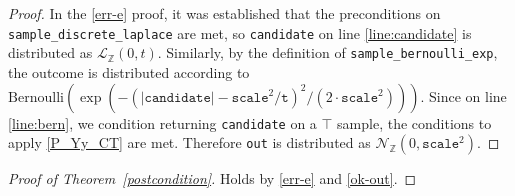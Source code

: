 \documentclass{article}
\begin{document}
\begin{proof} 
    In the \ref{err-e} proof, it was established that the preconditions on \texttt{sample\_discrete\_laplace} are met,  
    so \texttt{candidate} on line \ref{line:candidate} is distributed as $\mathcal{L}_\mathbb{Z}(0, t)$. 
    Similarly, by the definition of \texttt{sample\_bernoulli\_exp}, the outcome is distributed according to $\mathrm{Bernoulli}(\exp(-(|\texttt{candidate}| - \texttt{scale}^2 / \texttt{t})^2 / (2 \cdot \texttt{scale}^2)))$. 
    Since on line \ref{line:bern}, we condition returning \texttt{candidate} on a $\top$ sample,  
    the conditions to apply \ref{P_Yy_CT} are met.  
    Therefore \texttt{out} is distributed as $\mathcal{N}_\mathbb{Z}(0, \texttt{scale}^2)$. 
\end{proof} 
 
\begin{proof}[Proof of Theorem~\ref{postcondition}]
    Holds by \ref{err-e} and \ref{ok-out}. 
\end{proof} 
 
 
 
 
\end{document}

